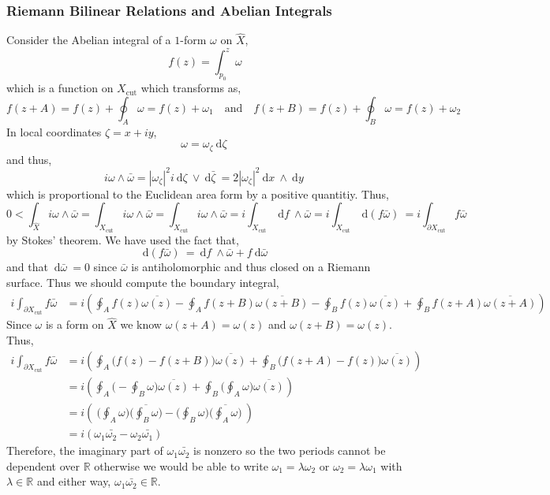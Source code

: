 \documentclass[12pt]{extarticle}
\newcommand{\R}{\mathbb{R}}
\renewcommand{\d}[1]{\: \mathrm{d}#1 \:}
\theoremstyle{definition}
\newcommand{\Xcut}{X_{\text{cut}}}
\begin{document}
\subsubsection{Riemann Bilinear Relations and Abelian Integrals}
Consider the Abelian integral of a $1$-form $\omega$ on $\hat{X}$,
\[ f(z) = \int_{p_0}^z \omega \]
which is a function on $\Xcut$ which transforms as,
\[ f(z + A) = f(z) + \oint_A \omega = f(z) + \omega_1 \quad \text{and} \quad f(z + B) = f(z) + \oint_B \omega = f(z) + \omega_2 \]
In local coordinates $\zeta = x + i y$,
\[ \omega = \omega_{\zeta} \d{\zeta} \]
and thus,
\[ i \omega \wedge \bar{\omega} = |\omega_\zeta |^2 i \d{\zeta} \vee \d{\bar{\zeta}} = 2 | \omega_\zeta|^2 \d{x} \wedge \d{y} \]
which is proportional to the Euclidean area form by a positive quantitiy. Thus,
\[ 0 < \int_{\hat{X}} i \omega \wedge \bar{\omega} = \int_{\Xcut} i \omega \wedge \bar{\omega} = \int_{\Xcut} i \omega \wedge \bar{\omega} = i\int_{\Xcut} \d{f} \wedge \bar{\omega} = i \int_{\Xcut} \d{(f \bar{\omega})} = i \int_{\partial \Xcut} f \bar{\omega} \]
by Stokes' theorem. We have used the fact that,
\[ \d{(f \bar{\omega})} = \d{f} \wedge \bar{\omega} + f \d{\bar{\omega}} \]
and that $\d{\bar{\omega}} = 0$ since $\bar{\omega}$ is antiholomorphic and thus closed on a Riemann surface. Thus we should compute the boundary integral,
\begin{align*}
i \int_{\partial \Xcut} f \bar{\omega} & = i \left( \oint_A f(z) \overline{\omega(z)} - \oint_A f(z + B) \overline{\omega(z + B)} - \oint_B f(z) \overline{\omega(z)} + \oint_B f(z + A) \overline{\omega(z + A)} \right)
\end{align*} 
Since $\omega$ is a form on $\hat{X}$ we know $\omega(z + A) = \omega(z)$ and $\omega(z + B) = \omega(z)$. Thus,
\begin{align*}
i \int_{\partial \Xcut} f \bar{\omega} & = i \left( \oint_A \Big( f(z)  - f(z + B) \Big) \overline{\omega(z)} + \oint_B \Big( f(z + A) - f(z) \Big) \overline{\omega(z)} \right)
\\
& = i \left( \oint_A \Big( - \oint_B \omega \Big) \overline{\omega(z)} + \oint_B \Big( \oint_A \omega \Big) \overline{\omega(z)} \right)
\\
& = i \left( \: \Big( \oint_A \omega \Big) \overline{\Big( \oint_B \omega \Big)} - \Big( \oint_B \omega \Big) \overline{\Big( \oint_A \omega \Big)} \: \right)
\\
& = i \left( \omega_1 \bar{\omega_2} - \omega_2 \bar{\omega_1} \right) 
\end{align*} 
Therefore, the imaginary part of $\omega_1 \bar{\omega_2}$ is nonzero so the two periods cannot be dependent over $\R$ otherwise we would be able to write $\omega_1 = \lambda \omega_2$ or $\omega_2 = \lambda \omega_1$ with $\lambda \in \R$ and either way, $\omega_1 \bar{\omega_2} \in \R$. 
\end{document}
